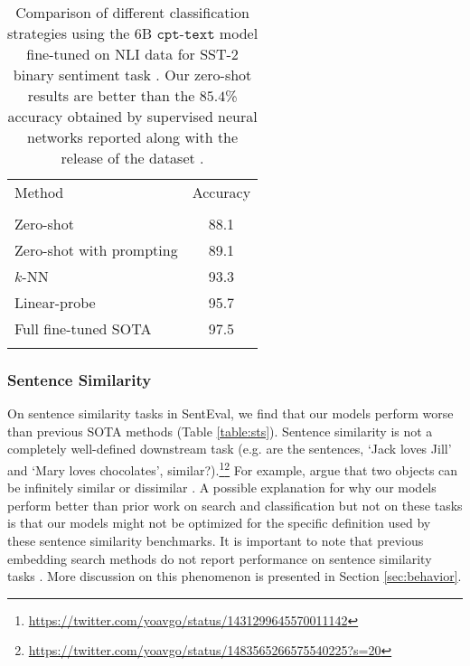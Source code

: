 \documentclass[nohyperref]{article}
\begin{document}
\begin{table}[]
\centering
\begin{tabular}{l|c}
\Xhline{2.5\arrayrulewidth}
Method                      & Accuracy \\ 
\Xhline{1\arrayrulewidth} \\[-1.5ex]
Zero-shot                   & 88.1 \\
Zero-shot with prompting    & 89.1 \\
$k$-NN                      & 93.3 \\
Linear-probe                & 95.7 \\
Full fine-tuned SOTA        & 97.5 \\
\Xhline{2.5\arrayrulewidth}
\end{tabular}
\caption{Comparison of different classification strategies using the 6B $\texttt{cpt-text}$ model fine-tuned on NLI data for SST-2 binary sentiment task \cite{sst}. Our zero-shot results are better than the $85.4$\% accuracy obtained by supervised neural networks reported along with the release of the dataset \cite{sst}.}
\label{table:sst}
\end{table}


\subsubsection{Sentence Similarity}
\label{sec:sts}

On sentence similarity tasks in SentEval, we find that our models perform worse than previous SOTA methods (Table \ref{table:sts}). Sentence similarity is not a completely well-defined downstream task (e.g. are the sentences, `Jack loves Jill' and `Mary loves chocolates', similar?).\footnote{\url{https://twitter.com/yoavgo/status/1431299645570011142}}\footnote{\url{https://twitter.com/yoavgo/status/1483565266575540225?s=20}} For example, \citet{similarity} argue that two objects can be infinitely similar or dissimilar \cite{Vervaeke2012RelevanceRA}. A possible explanation for why our models perform better than prior work on search and classification but not on these tasks is that our models might not be optimized for the specific definition used by these sentence similarity benchmarks. It is important to note that previous embedding search methods do not report performance on sentence similarity tasks \cite{dpr, e2e, contreiver}.  More discussion on this phenomenon is presented in Section \ref{sec:behavior}.  
\end{document}
